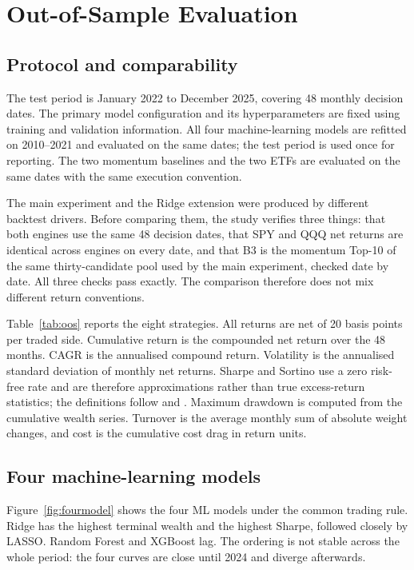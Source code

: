 \documentclass[11pt,a4paper]{article}
\begin{document}
\section{Out-of-Sample Evaluation}
\label{sec:oos}

\subsection{Protocol and comparability}

The test period is January 2022 to December 2025, covering 48 monthly decision dates. The primary model configuration and its hyperparameters are fixed using training and validation information. All four machine-learning models are refitted on 2010--2021 and evaluated on the same dates; the test period is used once for reporting. The two momentum baselines and the two ETFs are evaluated on the same dates with the same execution convention.

The main experiment and the Ridge extension were produced by different backtest drivers. Before comparing them, the study verifies three things: that both engines use the same 48 decision dates, that SPY and QQQ net returns are identical across engines on every date, and that B3 is the momentum Top-10 of the same thirty-candidate pool used by the main experiment, checked date by date. All three checks pass exactly. The comparison therefore does not mix different return conventions.

Table~\ref{tab:oos} reports the eight strategies. All returns are net of 20 basis points per traded side. Cumulative return is the compounded net return over the 48 months. CAGR is the annualised compound return. Volatility is the annualised standard deviation of monthly net returns. Sharpe and Sortino use a zero risk-free rate and are therefore approximations rather than true excess-return statistics; the definitions follow \citet{sharpe1966} and \citet{sortino1994}. Maximum drawdown is computed from the cumulative wealth series. Turnover is the average monthly sum of absolute weight changes, and cost is the cumulative cost drag in return units.



\subsection{Four machine-learning models}

Figure~\ref{fig:fourmodel} shows the four ML models under the common trading rule. Ridge has the highest terminal wealth and the highest Sharpe, followed closely by LASSO. Random Forest and XGBoost lag. The ordering is not stable across the whole period: the four curves are close until 2024 and diverge afterwards.
\end{document}

